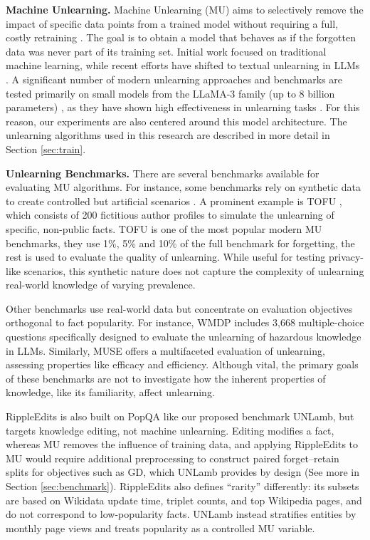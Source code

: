 \documentclass[11pt]{article}
\begin{document}
\textbf{Machine Unlearning.}
Machine Unlearning (MU) aims to selectively remove the impact of specific data points from a trained model without requiring a full, costly retraining \cite{mantelero2013eu, cao2015towards, sekhari2021remember}. The goal is to obtain a model that behaves as if the forgotten data was never part of its training set. Initial work focused on traditional machine learning, while recent efforts have shifted to textual unlearning in LLMs \cite{sekhari2021remember, kurmanji2023towards}.
A significant number of modern unlearning approaches and benchmarks are tested primarily on small models from the LLaMA-3 family (up to 8 billion parameters) \cite{yuan2025towards, maini2024tofu, wang2025selective, si2023knowledge}, as they have shown high effectiveness in unlearning tasks \cite{maini2024tofu, yuan2025towards}. For this reason, our experiments are also centered around this model architecture.
The unlearning algorithms used in this research are described in more detail in Section \ref{sec:train}.


\textbf{Unlearning Benchmarks.}
There are several benchmarks available for evaluating MU algorithms. For instance, some benchmarks rely on synthetic data to create controlled but artificial scenarios \cite{geng2025comprehensive, hu2024unlearning, si2023knowledge}. A prominent example is TOFU \cite{maini2024tofu}, which consists of 200 fictitious author profiles to simulate the unlearning of specific, non-public facts. TOFU is one of the most popular modern MU benchmarks, they use 1\%, 5\% and 10\% of the full benchmark for forgetting, the rest is used to evaluate the quality of unlearning. While useful for testing privacy-like scenarios, this synthetic nature does not capture the complexity of unlearning real-world knowledge of varying prevalence.

Other benchmarks use real-world data but concentrate on evaluation objectives orthogonal to fact popularity. For instance, WMDP \cite{li2024wmdp} includes 3,668 multiple-choice questions specifically designed to evaluate the unlearning of hazardous knowledge in LLMs. Similarly, MUSE \cite{shimuse} offers a multifaceted evaluation of unlearning, assessing properties like efficacy and efficiency. Although vital, the primary goals of these benchmarks are not to investigate how the inherent properties of knowledge, like its familiarity, affect unlearning.


RippleEdits \cite{cohen2024evaluating} is also built on PopQA like our proposed benchmark UNLamb, but targets knowledge editing, not machine unlearning. Editing modifies a fact, whereas MU removes the influence of training data, and applying RippleEdits to MU would require additional preprocessing to construct paired forget–retain splits for objectives such as GD, which UNLamb provides by design (See more in Section \ref{sec:benchmark}). RippleEdits also defines “rarity” differently: its subsets are based on Wikidata update time, triplet counts, and top Wikipedia pages, and do not correspond to low-popularity facts. UNLamb instead stratifies entities by monthly page views and treats popularity as a controlled MU variable. 
\end{document}
